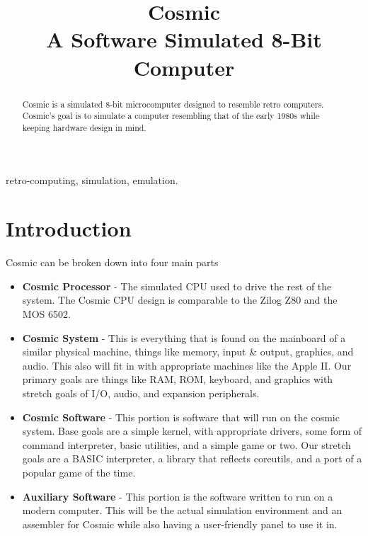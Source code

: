 \documentclass[conference]{IEEEtran}
\begin{document}
\title{
 Cosmic\\A Software Simulated 8-Bit Computer}

\author{
\and
{}

}

\maketitle

\begin{abstract}
Cosmic is a simulated 8-bit microcomputer designed to resemble retro computers. Cosmic's goal is to simulate a computer resembling that of the early 1980s while keeping hardware design in mind. 
\end{abstract}

\begin{IEEEkeywords}
retro-computing, simulation, emulation.
\end{IEEEkeywords}

\section{Introduction}
Cosmic can be broken down into four main parts
\begin{itemize}
    \item \textbf{Cosmic Processor} - The simulated CPU used to drive the rest of the system. The Cosmic CPU design is comparable to the Zilog Z80 and the MOS 6502. 
    \item \textbf{Cosmic System} - This is everything that is found on the mainboard of a similar physical machine, things like memory, input \& output, graphics, and audio. This also will fit in with appropriate machines like the Apple II. Our primary goals are things like RAM, ROM, keyboard, and graphics with stretch goals of I/O, audio, and expansion peripherals. 
    \item \textbf{Cosmic Software}  - This portion is software that will run on the cosmic system. Base goals are a simple kernel, with appropriate drivers, some form of command interpreter, basic utilities, and a simple game or two. Our stretch goals are a BASIC interpreter, a library that reflects coreutils, and a port of a popular game of the time. 
    \item \textbf{Auxiliary Software} - This portion is the software written to run on a modern computer. This will be the actual simulation environment and an assembler for Cosmic while also having a user-friendly panel to use it in.
\end{itemize}
\end{document}
